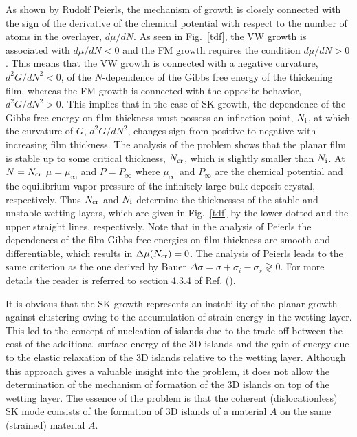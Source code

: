 \documentclass[aps,prl,showpacs,twocolumn,byrevtex,floatfix]{revtex4-1}
\begin{document}
As shown by Rudolf Peierls, the mechanism of growth is closely connected
with the sign of the derivative of the chemical potential with respect to
the number of atoms in the overlayer, $d\mu /dN$.\cite{Peierls78} As seen in
Fig.~\ref{tdf}, the VW growth is associated with $d\mu /dN < 0$ and the FM
growth requires the condition $d\mu /dN > 0$. This means that the VW growth is
connected with a negative curvature, $d^2G/dN^2 < 0$, of the $N$-dependence of
the Gibbs free energy of the thickening film, whereas the FM growth is connected
with the opposite behavior, $d^2G/dN^2 > 0$. This implies that in the case
of SK growth, the dependence of the Gibbs free energy on film thickness must
possess an inflection point, $N_{\rm i}$, at which the curvature of $G$,
$d^2G/dN^2$,  changes sign from positive to negative with increasing film
thickness. The analysis of the problem shows that the planar film is stable up
to some critical thickness, $N_{\rm cr}$, which is slightly smaller
than $N_{\rm i}$. At $N = N_{\rm cr}$ $\mu = \mu_{\infty}$ and $P = P_{\infty}$
where $\mu_{\infty}$ and $P_{\infty}$ are the chemical potential and the
equilibrium vapor pressure of the infinitely large bulk deposit crystal,
respectively. Thus $N_{\rm cr}$ and $N_{\rm i}$ determine the thicknesses of the
stable and unstable wetting layers, which are given in Fig.\ \ref{tdf} by 
the lower dotted and the upper straight lines, respectively. Note that in the
analysis of Peierls the dependences of the film Gibbs free energies on film
thickness are smooth and differentiable, which results in $\Delta \mu (N_{\rm
cr}) = 0$. The analysis of Peierls leads to the same criterion as the one
derived by Bauer $\Delta \sigma = \sigma + \sigma_i - \sigma_s \gtrless 0$. For
more details the reader is referred to section 4.3.4 of Ref.
().



It is obvious that the SK growth represents an instability of the planar growth
against clustering owing to the accumulation of strain energy in the wetting
layer. This led to the concept of nucleation of islands
due to the trade-off between the cost of the additional surface energy of the
3D islands and the gain of energy due to the elastic relaxation of the 3D
islands relative to the wetting layer\cite{Tersoff93,Tersoff94,Politi00}.
Although this approach gives a valuable insight into the problem, it does not
allow the determination of the mechanism of formation of the 3D islands on top
of the wetting layer. The essence of the problem is that the coherent
(dislocationless) SK mode consists of the formation of 3D islands of a material
$A$ on the same (strained) material $A$.\cite{Eaglesham90}
\end{document}
